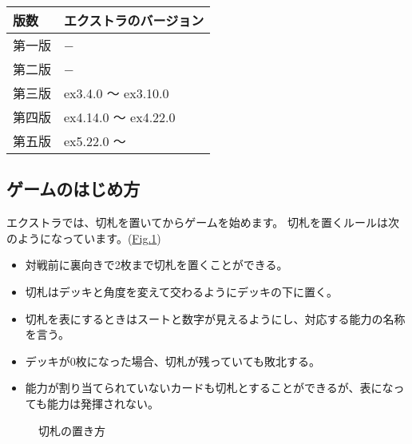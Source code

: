 \documentclass[letterpaper,10pt,dvipdfmx]{sphinxmanual}
\begin{document}
\begin{savenotes}\sphinxattablestart
\centering
{}
\sphinxthecaptionisattop
{}\label{\detokenize{common/06-extra:id11}}\label{\detokenize{common/06-extra:ver-ex}}
\sphinxaftertopcaption
\begin{tabulary}{\linewidth}[t]{|T|T|}
\hline
\sphinxstyletheadfamily 
版数
&\sphinxstyletheadfamily 
エクストラのバージョン
\\
\hline
第一版
&
−
\\
\hline
第二版
&
−
\\
\hline
第三版
&
ex3.4.0 〜 ex3.10.0
\\
\hline
第四版
&
ex4.14.0 〜 ex4.22.0
\\
\hline
第五版
&
ex5.22.0 〜
\\
\hline
\end{tabulary}
\par
\sphinxattableend\end{savenotes}


\subsection{ゲームのはじめ方}
\label{\detokenize{common/06-extra:id6}}
エクストラでは、切札を置いてからゲームを始めます。
切札を置くルールは次のようになっています。(\hyperref[\detokenize{common/06-extra:trump}]{Fig.\@ \ref{\detokenize{common/06-extra:trump}}})
\begin{itemize}
\item {} 
対戦前に裏向きで2枚まで切札を置くことができる。

\item {} 
切札はデッキと角度を変えて交わるようにデッキの下に置く。

\item {} 
切札を表にするときはスートと数字が見えるようにし、対応する能力の名称を言う。

\item {} 
デッキが0枚になった場合、切札が残っていても敗北する。

\item {} 
能力が割り当てられていないカードも切札とすることができるが、表になっても能力は発揮されない。

\end{itemize}

\begin{figure}[htbp]
\centering
\capstart

\noindent{}
\caption{切札の置き方}\label{\detokenize{common/06-extra:id12}}\label{\detokenize{common/06-extra:trump}}\end{figure}
\end{document}
